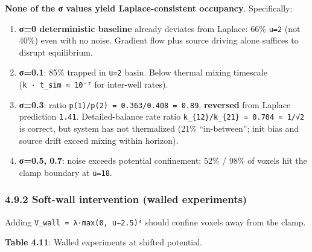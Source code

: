 \documentclass[
]{article}
\providecommand{\tightlist}{%
  \setlength{\itemsep}{0pt}\setlength{\parskip}{0pt}}
\begin{document}
\textbf{None of the σ values yield Laplace-consistent occupancy}.
Specifically:

\begin{enumerate}
\def\labelenumi{\arabic{enumi}.}
\tightlist
\item
  \textbf{σ=0 deterministic baseline} already deviates from Laplace:
  66\% \texttt{u=2} (not 40\%) even with no noise. Gradient flow plus
  source driving alone suffices to disrupt equilibrium.
\item
  \textbf{σ=0.1}: 85\% trapped in \texttt{u=2} basin. Below thermal
  mixing timescale (\texttt{k\ ·\ t\_sim\ ≈\ 10⁻⁷} for inter-well
  rates).
\item
  \textbf{σ=0.3}: ratio \texttt{p(1)/p(2)\ =\ 0.363/0.408\ =\ 0.89},
  \textbf{reversed} from Laplace prediction \texttt{1.41}.
  Detailed-balance rate ratio
  \texttt{k\_\{12\}/k\_\{21\}\ =\ 0.704\ ≈\ 1/√2} is correct, but system
  has not thermalized (21\% ``in-between''; init bias and source drift
  exceed mixing within horizon).
\item
  \textbf{σ=0.5, 0.7}: noise exceeds potential confinement; 52\% / 98\%
  of voxels hit the clamp boundary at \texttt{u=18}.
\end{enumerate}

\hypertarget{soft-wall-intervention-walled-experiments}{%
\subsubsection{4.9.2 Soft-wall intervention (walled
experiments)}\label{soft-wall-intervention-walled-experiments}}

Adding \texttt{V\_wall\ =\ λ·max(0,\ u−2.5)⁴} should confine voxels away
from the clamp.

\textbf{Table 4.11}: Walled experiments at shifted potential.
\end{document}
